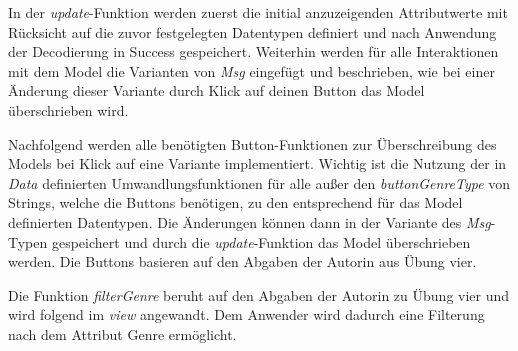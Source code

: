 \documentclass[usegeometry=true]{scrartcl}
\begin{document}
In der \textit{update}-Funktion werden zuerst die initial anzuzeigenden Attributwerte mit Rücksicht auf die zuvor festgelegten Datentypen definiert und nach Anwendung der Decodierung in Success gespeichert. 
Weiterhin werden für alle Interaktionen mit dem Model die Varianten von \textit{Msg} eingefügt und beschrieben, wie bei einer Änderung dieser Variante durch Klick auf deinen Button das Model überschrieben wird.

Nachfolgend werden alle benötigten Button-Funktionen zur Überschreibung des Models bei Klick auf eine Variante implementiert.
Wichtig ist die Nutzung der in \textit{Data} definierten Umwandlungsfunktionen für alle außer den \textit{buttonGenreType} von Strings, welche die Buttons benötigen, zu den entsprechend für das Model definierten Datentypen. 
Die Änderungen können dann in der Variante des \textit{Msg}-Typen gespeichert und durch die \textit{update}-Funktion das Model überschrieben werden.
Die Buttons basieren auf den Abgaben der Autorin aus Übung vier.

Die Funktion \textit{filterGenre} beruht auf den Abgaben der Autorin zu Übung vier und wird folgend im \textit{view} angewandt. 
Dem Anwender wird dadurch eine Filterung nach dem Attribut Genre ermöglicht.
\end{document}
